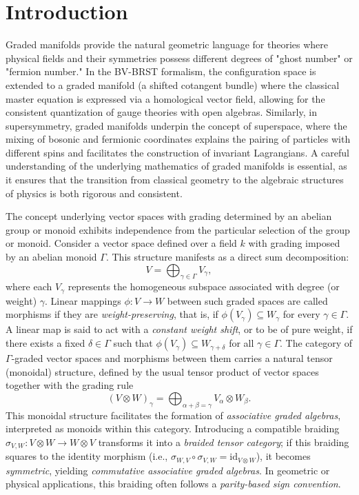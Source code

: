 \documentclass[a4paper,12pt]{amsart}
\begin{document}
\renewcommand{\theequation}{\thesection.\arabic{equation}}
\section*{Introduction}\label{sec:introduction}


\noindent Graded manifolds provide the natural geometric language for theories where physical fields and their symmetries possess different degrees of "ghost number" or "fermion number." In the BV-BRST formalism, the configuration space is extended to a graded manifold (a shifted cotangent bundle) where the classical master equation is expressed via a homological vector field, allowing for the consistent quantization of gauge theories with open algebras. Similarly, in supersymmetry, graded manifolds underpin the concept of superspace, where the mixing of bosonic and fermionic coordinates explains the pairing of particles with different spins and facilitates the construction of invariant Lagrangians. A careful understanding of the underlying mathematics of graded manifolds is essential, as it ensures that the transition from classical geometry to the algebraic structures of physics is both rigorous and consistent.

\smallskip\noindent The concept underlying vector spaces with grading determined by an abelian group or monoid exhibits independence from the particular selection of the group or monoid.
 Consider a vector space defined over a field $k$ with grading imposed by an abelian monoid $\Gamma$. This structure manifests as a direct sum decomposition:
\[
V = \bigoplus_{\gamma \in \Gamma} V_\gamma,
\]
where each $V_\gamma$ represents the homogeneous subspace associated with degree (or weight) $\gamma$. Linear mappings $\phi: V \to W$ between such graded spaces are called morphisms if they are \emph{weight-preserving}, that is, if $\phi(V_\gamma) \subseteq W_\gamma$ for every $\gamma \in \Gamma$. A linear map is said to act with a \emph{constant weight shift}, or to be of pure weight, if there exists a fixed $\delta \in \Gamma$ such that $\phi(V_\gamma) \subseteq W_{\gamma + \delta}$ for all $\gamma \in \Gamma$.
The category of $\Gamma$-graded vector spaces and morphisms between them carries a natural tensor (monoidal) structure, defined by the usual tensor product of vector spaces together with the grading rule
\[
(V \otimes W)_\gamma = \bigoplus_{\alpha + \beta = \gamma} V_\alpha \otimes W_\beta.
\]
This monoidal structure facilitates the formation of \emph{associative graded algebras}, interpreted as monoids within this category. Introducing a compatible braiding $\sigma_{V,W}: V \otimes W \to W \otimes V$ transforms it into a \emph{braided tensor category}; if this braiding squares to the identity morphism (i.e., $\sigma_{W,V} \circ \sigma_{V,W} = \mathrm{id}_{V \otimes W}$), it becomes \emph{symmetric}, yielding \emph{commutative associative graded algebras}. In geometric or physical applications, this braiding often follows a \emph{parity-based sign convention}.
\end{document}

